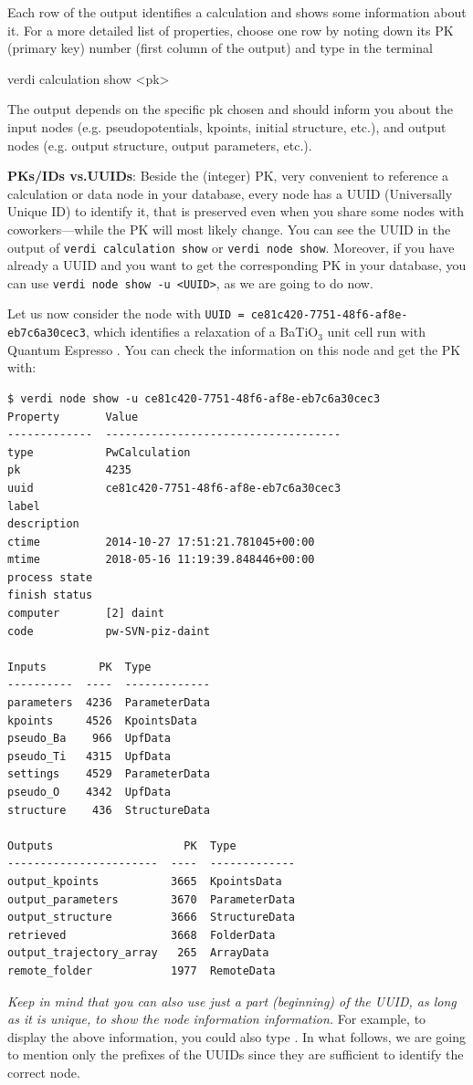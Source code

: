 Each row of the output identifies a calculation and shows some information about it. For a more detailed list of properties, choose one row by noting down its PK (primary key) number (first column of the output) and type in the terminal 
\begin{bashcommand}
verdi calculation show <pk>
\end{bashcommand}
The output depends on the specific pk chosen and should inform you about the input nodes (e.g. pseudopotentials, kpoints, initial structure, etc.), and output nodes (e.g. output structure, output parameters, etc.). 

\begin{tcolorbox}
\textbf{PKs/IDs vs.\@ UUIDs}: Beside the (integer) PK, very convenient to reference a calculation or data node
in your database, every node has a UUID (Universally Unique ID) to identify it, that is preserved even when you share some nodes with coworkers---while the PK
will most likely change. You can see the UUID in the output of \texttt{verdi calculation show} or \texttt{verdi node show}. Moreover, if you have already a UUID and you want
to get the corresponding PK in your database, you can use \texttt{verdi node show -u <UUID>},
as we are going to do now.
\end{tcolorbox}

Let us now consider the node with \texttt{UUID = ce81c420-7751-48f6-af8e-eb7c6a30cec3}, which identifies a relaxation of a BaTiO$_3$ unit cell run with Quantum Espresso .
You can check the information on this node and get the PK with:
\begin{verbatim}
$ verdi node show -u ce81c420-7751-48f6-af8e-eb7c6a30cec3
Property       Value
-------------  ------------------------------------
type           PwCalculation
pk             4235
uuid           ce81c420-7751-48f6-af8e-eb7c6a30cec3
label
description
ctime          2014-10-27 17:51:21.781045+00:00
mtime          2018-05-16 11:19:39.848446+00:00
process state
finish status
computer       [2] daint
code           pw-SVN-piz-daint

Inputs        PK  Type
----------  ----  -------------
parameters  4236  ParameterData
kpoints     4526  KpointsData
pseudo_Ba    966  UpfData
pseudo_Ti   4315  UpfData
settings    4529  ParameterData
pseudo_O    4342  UpfData
structure    436  StructureData

Outputs                    PK  Type
-----------------------  ----  -------------
output_kpoints           3665  KpointsData
output_parameters        3670  ParameterData
output_structure         3666  StructureData
retrieved                3668  FolderData
output_trajectory_array   265  ArrayData
remote_folder            1977  RemoteData
\end{verbatim}
\emph{Keep in mind that you can also use just a part (beginning) of the UUID, as long as it is unique, to show the node information information.} For example, to display the above information, you could also type . In what follows, we are going to mention only the prefixes of the UUIDs since they are sufficient to identify the correct node.

